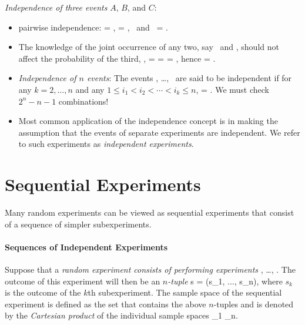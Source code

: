 	\item \emph{Independence of three events}
	$A$, $B$, and $C$:
	\begin{itemize}
		\item pairwise independence:
		\beq
			 =  ,
			 =  ,
			\mbox{ and }
			 =  .
		\eeq

		\item The knowledge of the joint occurrence of any two,
		say \sA\ and \sB,
		should not affect the probability of the third,
		\ie,
		\beq
			 = 
			\iff
			 = 
				= ,
		\eeq
		hence
		\beq
			 =   .
		\eeq

		\item \emph{Independence of $n$ events}:
		The events , \ldots, \ are said to be independent
		if for any $k=2,\ldots,n$ and any $1\leq i_1 < i_2 < \cdots < i_k \leq n$,
			 =  \cdots {}.
		\eeql
		We must check $2^n-n-1$ combinations!

		\item
		Most common application
		of the independence concept is
		in making the assumption that the events of separate experiments are independent.
		We refer to such experiments as \emph{independent experiments}.

	\end{itemize}

\eit

\section{Sequential Experiments}
\bit
	\item
	Many random experiments can be viewed as sequential experiments
	that consist of a sequence of simpler subexperiments.
\eit

\paragraph{Sequences of Independent Experiments}

\bit
	\item Suppose that a \emph{random experiment consists of performing experiments}
	, \ldots, .
	The outcome of this experiment will then be an \emph{$n$-tuple}
	\beq
		s = (s_1, ..., s_n),
	\eeq
	where $s_k$ is the outcome of the $k$th subexperiment.
	The sample space of the sequential experiment is defined
	as the set that contains the above $n$-tuples
	and is denoted by the \emph{Cartesian product}
	of the individual sample spaces
		\sspace_1 \times \cdots \times \sspace_n.
	\eeql

